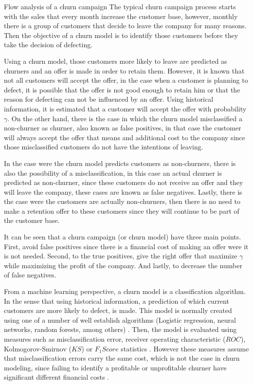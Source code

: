 \begin{remark}{Flow analysis of a churn campaign}
The typical churn campaign process starts with the sales that every month increase the customer 
base, however, monthly there is a group of customers that decide to leave the company for many 
reasons. Then the objective of a churn model is to identify those customers before they take the 
decision of defecting.

Using a churn model, those customers more likely to leave are predicted as churners and 
an offer is made in order to retain them. However, it is known that not all customers will accept 
the offer, in the case when a customer is planning to defect, it is possible that the offer is not 
good enough to retain him or that the reason for defecting can not be influenced by an offer.
Using historical information, it is estimated that a customer will accept the offer with 
probability $\gamma$.
On the other hand, there is the case in which the churn model misclassified a non-churner as 
churner, also known as false positives, in that case the customer will always accept the offer that 
means and additional cost to the company since those misclassified customers do not have the 
intentions of leaving.

In the case were the churn model predicts customers as non-churners, there is also the possibility 
of a misclassification, in this case an actual churner is predicted as non-churner, since 
these customers do not receive an offer and they will leave the company, these cases are known as 
false negatives. Lastly, there is the case were the customers are actually non-churners, then 
there is no need to make a retention offer to these customers since they will continue to be part 
of the customer base.
\end{remark}

It can be seen that a churn campaign (or churn model) have three main points. First, avoid false 
positives since there is a financial cost of making an offer were it is not needed. Second, to the 
true positives, give the right offer that maximize $\gamma$ while maximizing the profit of the 
company. And lastly, to decrease the number of false negatives.

From a machine learning perspective, a churn model is a classification algorithm.
In the sense that using historical information, a prediction of which current customers 
are more likely to defect, is made. This model is normally created using one of a number of 
well establish algorithms (Logistic regression, neural networks, random forests, among 
others) \citep{Ngai2009,KhakAbi2010}. Then, the model is evaluated using measures such as 
misclassification error, receiver operating characteristic ($ROC$),  Kolmogorov-Smirnov ($KS$) 
or \mbox{$F_1Score$} statistics \citep{Verbeke2012}. However these measures assume that 
misclassification errors     carry the same cost, which is not the case in churn modeling, since 
failing to identify a profitable or unprofitable churner have significant different financial costs
\citep{Glady2009}. 
	
